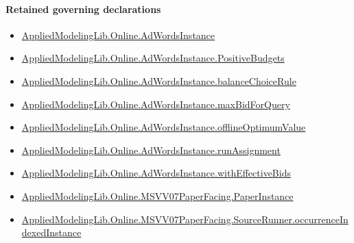 \documentclass[10pt]{article}
\begin{document}
\paragraph{Retained governing declarations}
\begin{itemize}\raggedright
\item \hyperlink{governing-declaration-e5ce49672bf26ab1}{Applied\allowbreak{}Modeling\allowbreak{}Lib.\allowbreak{}Online.\allowbreak{}Ad\allowbreak{}Words\allowbreak{}Instance}
\item \hyperlink{governing-declaration-eabdcef9dca00922}{Applied\allowbreak{}Modeling\allowbreak{}Lib.\allowbreak{}Online.\allowbreak{}Ad\allowbreak{}Words\allowbreak{}Instance.\allowbreak{}Positive\allowbreak{}Budgets}
\item \hyperlink{governing-declaration-47ab5f144ca5a666}{Applied\allowbreak{}Modeling\allowbreak{}Lib.\allowbreak{}Online.\allowbreak{}Ad\allowbreak{}Words\allowbreak{}Instance.\allowbreak{}balance\allowbreak{}Choice\allowbreak{}Rule}
\item \hyperlink{governing-declaration-af1b7d959c110360}{Applied\allowbreak{}Modeling\allowbreak{}Lib.\allowbreak{}Online.\allowbreak{}Ad\allowbreak{}Words\allowbreak{}Instance.\allowbreak{}max\allowbreak{}Bid\allowbreak{}For\allowbreak{}Query}
\item \hyperlink{governing-declaration-421b6f6fda18a867}{Applied\allowbreak{}Modeling\allowbreak{}Lib.\allowbreak{}Online.\allowbreak{}Ad\allowbreak{}Words\allowbreak{}Instance.\allowbreak{}offline\allowbreak{}Optimum\allowbreak{}Value}
\item \hyperlink{governing-declaration-1878a8a2b3e3182d}{Applied\allowbreak{}Modeling\allowbreak{}Lib.\allowbreak{}Online.\allowbreak{}Ad\allowbreak{}Words\allowbreak{}Instance.\allowbreak{}run\allowbreak{}Assignment}
\item \hyperlink{governing-declaration-5df6277539ea570d}{Applied\allowbreak{}Modeling\allowbreak{}Lib.\allowbreak{}Online.\allowbreak{}Ad\allowbreak{}Words\allowbreak{}Instance.\allowbreak{}with\allowbreak{}Effective\allowbreak{}Bids}
\item \hyperlink{governing-declaration-11907576ec71eeb5}{Applied\allowbreak{}Modeling\allowbreak{}Lib.\allowbreak{}Online.\allowbreak{}MSVV07\allowbreak{}Paper\allowbreak{}Facing.\allowbreak{}Paper\allowbreak{}Instance}
\item \hyperlink{governing-declaration-15d177ff0033a703}{Applied\allowbreak{}Modeling\allowbreak{}Lib.\allowbreak{}Online.\allowbreak{}MSVV07\allowbreak{}Paper\allowbreak{}Facing.\allowbreak{}Source\allowbreak{}Runner.\allowbreak{}occurrence\allowbreak{}Indexed\allowbreak{}Instance}

\end{itemize}
\end{document}
